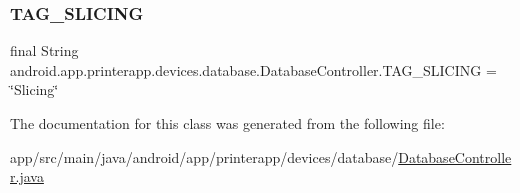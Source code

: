 \subsubsection{\texorpdfstring{T\+A\+G\+\_\+\+S\+L\+I\+C\+I\+NG}{TAG\_SLICING}}
{\footnotesize\ttfamily final String android.\+app.\+printerapp.\+devices.\+database.\+Database\+Controller.\+T\+A\+G\+\_\+\+S\+L\+I\+C\+I\+NG = \char`\"{}Slicing\char`\"{}\hspace{0.3cm}{\ttfamily [static]}}



The documentation for this class was generated from the following file\+:\begin{DoxyCompactItemize}
\item 
app/src/main/java/android/app/printerapp/devices/database/\hyperlink{_database_controller_8java}{Database\+Controller.\+java}\end{DoxyCompactItemize}
